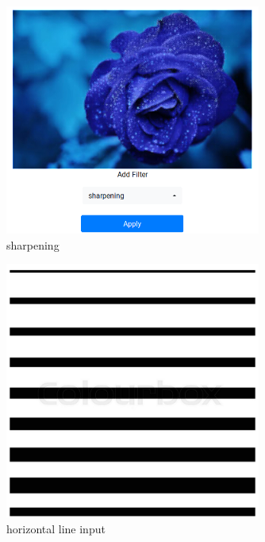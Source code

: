 \documentclass{article}
\begin{document}
  \begin{figure}[!htb]
    \centering
    \includegraphics[width=0.75\textwidth]{assets/sharpened.png}
    \caption{sharpening}
    \label{fig:sharpened}
  \end{figure}

  \begin{figure}[!htb]
    \centering
    \includegraphics[width=0.75\textwidth]{assets/horizontal_line.png}
    \caption{horizontal line input}
    \label{fig:horizontal-line}
  \end{figure}
\end{document}

